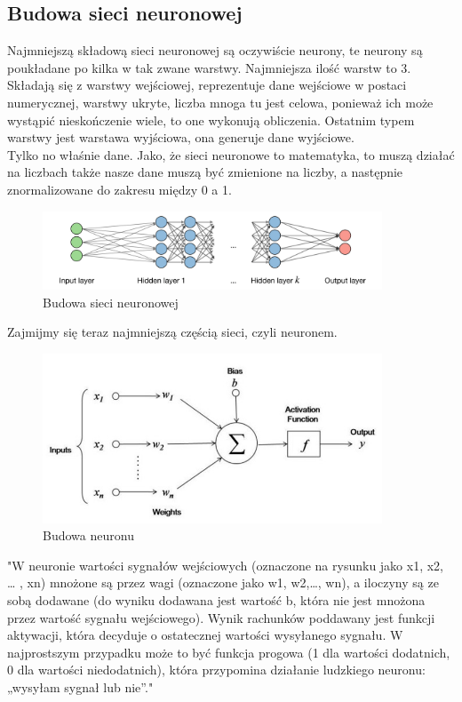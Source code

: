 \documentclass[12pt]{article}
\begin{document}
\begin{sloppypar}
{  \subsection{Budowa sieci neuronowej}
  {
    Najmniejszą składową sieci neuronowej są oczywiście neurony, te neurony są poukładane po kilka w tak zwane warstwy. 
    Najmniejsza ilość warstw to 3. 
    Składają się z warstwy wejściowej, reprezentuje dane wejściowe w postaci numerycznej, warstwy ukryte, liczba mnoga tu jest celowa, ponieważ ich może wystąpić nieskończenie wiele, to one wykonują obliczenia.
    Ostatnim typem warstwy jest warstawa wyjściowa, ona generuje dane wyjściowe. \\
    Tylko no właśnie dane. Jako, że sieci neuronowe to matematyka, to muszą działać na liczbach także nasze dane muszą być zmienione na liczby, a następnie znormalizowane do zakresu między 0 a 1.
    \begin{figure}[H]
      \centering
      \includegraphics[width=0.9\textwidth]{neural-network-stanford.png}
      \caption{Budowa sieci neuronowej \cite{nlp}}
      \label{fig:nn}
    \end{figure}
    Zajmijmy się teraz najmniejszą częścią sieci, czyli neuronem.
    \begin{figure}[H]
      \centering
      \includegraphics[width=0.9\textwidth]{perceptron.png}
      \caption{Budowa neuronu \cite{nlp}}
      \label{fig:neuron}
    \end{figure}
    "W neuronie wartości sygnałów wejściowych (oznaczone na rysunku jako x1, x2, … , xn) mnożone są przez wagi (oznaczone jako w1, w2,…, wn), a iloczyny są ze sobą dodawane (do wyniku dodawana jest wartość b, która nie jest mnożona przez wartość sygnału wejściowego). 
    Wynik rachunków poddawany jest funkcji aktywacji, która decyduje o ostatecznej wartości wysyłanego sygnału. 
    W najprostszym przypadku może to być funkcja progowa (1 dla wartości dodatnich, 0 dla wartości niedodatnich), która przypomina działanie ludzkiego neuronu: „wysyłam sygnał lub nie”."\cite{nlp}
  }
}
\end{sloppypar}
\end{document}
